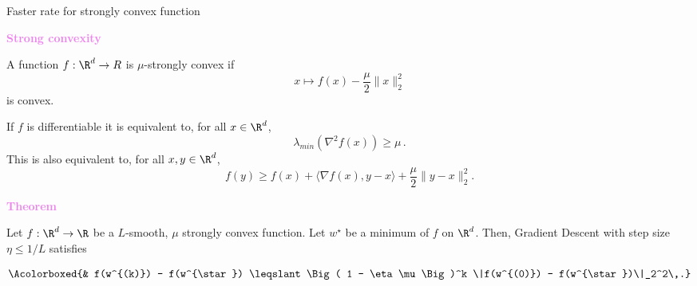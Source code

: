 \documentclass[xcolor={usenames,dvipsnames}]{beamer}
\begin{document}


\begin{frame}{Faster rate for strongly convex function}
	
\textbf{\textcolor{violet}{Strong convexity}}

A function $f: \R^d \to R$ is \alert{$\mu$-strongly convex} if 
$$
x \mapsto  f(x) - \frac{\mu}{2}\|x\|_2^2 
$$
is convex.

\medskip 
	
If $f$ is differentiable it is equivalent to, for all $x \in \R^d$, 
$$
\lambda_{min}(\nabla^2 f(x)) \geqslant \mu\,.
$$
This is also equivalent to, for all $x,y \in \R^d$, 
$$
f(y) \geqslant f(x) + \langle \nabla f (x), y-x\rangle + \frac{\mu}{2} \|y-x\|_2^2.
$$
	
\textbf{\textcolor{violet}{Theorem}}

Let $f : \R^d \to \R$ be a \alert{$L$-smooth, $\mu$ strongly convex function}. Let $w^{\star}$ be a minimum of $f$ on $\R^d$. Then, Gradient Descent with step size $\eta \leq 1/L$ satisfies

\begin{align*}
\Acolorboxed{&
f(w^{(k)}) - f(w^{\star}) \leqslant \Big( 1 - \eta \mu \Big)^k \|f(w^{(0)}) - f(w^{\star})\|_2^2\,.}
\end{align*}
	
\end{frame}
\end{document}

